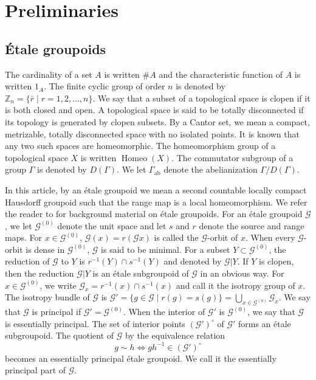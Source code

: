 \documentclass[11pt]{article}
\theoremstyle{definition}
\numberwithin{equation}{section}
\newcommand{\Homeo}{\operatorname{Homeo}}
\newcommand{\ab}{\mathrm{ab}}
\newcommand{\G}{\mathcal{G}}
\newcommand{\Z}{\mathbb{Z}}
\begin{document}
\section{Preliminaries}




\subsection{\'Etale groupoids}

The cardinality of a set $A$ is written $\#A$ and 
the characteristic function of $A$ is written $1_A$. 
The finite cyclic group of order $n$ is denoted 
by $\Z_n=\{\bar{r}\mid r=1,2,\dots,n\}$. 
We say that a subset of a topological space is clopen 
if it is both closed and open. 
A topological space is said to be totally disconnected 
if its topology is generated by clopen subsets. 
By a Cantor set, 
we mean a compact, metrizable, totally disconnected space 
with no isolated points. 
It is known that any two such spaces are homeomorphic. 
The homeomorphism group of a topological space $X$ is written $\Homeo(X)$. 
The commutator subgroup of a group $\Gamma$ is denoted by $D(\Gamma)$. 
We let $\Gamma_\ab$ denote the abelianization $\Gamma/D(\Gamma)$. 

In this article, by an \'etale groupoid 
we mean a second countable locally compact Hausdorff groupoid 
such that the range map is a local homeomorphism. 
We refer the reader to \cite{Rtext,R08Irish} 
for background material on \'etale groupoids. 
For an \'etale groupoid $\G$, 
we let $\G^{(0)}$ denote the unit space and 
let $s$ and $r$ denote the source and range maps. 
For $x\in\G^{(0)}$, 
$\G(x)=r(\G x)$ is called the $\G$-orbit of $x$. 
When every $\G$-orbit is dense in $\G^{(0)}$, 
$\G$ is said to be minimal. 
For a subset $Y\subset\G^{(0)}$, 
the reduction of $\G$ to $Y$ is $r^{-1}(Y)\cap s^{-1}(Y)$ and 
denoted by $\G|Y$. 
If $Y$ is clopen, then 
the reduction $\G|Y$ is an \'etale subgroupoid of $\G$ in an obvious way. 
For $x\in\G^{(0)}$, 
we write $\G_x=r^{-1}(x)\cap s^{-1}(x)$ and call it the isotropy group of $x$. 
The isotropy bundle of $\G$ is 
$\G'=\{g\in\G\mid r(g)=s(g)\}=\bigcup_{x\in\G^{(0)}}\G_x$. 
We say that $\G$ is principal if $\G'=\G^{(0)}$. 
When the interior of $\G'$ is $\G^{(0)}$, 
we say that $\G$ is essentially principal. 
The set of interior points $(\G')^\circ$ of $\G'$ forms 
an \'etale subgroupoid. 
The quotient of $\G$ by the equivalence relation 
\[
g\sim h\iff gh^{-1}\in(\G')^\circ
\]
becomes an essentially principal \'etale groupoid. 
We call it the essentially principal part of $\G$. 
\end{document}
